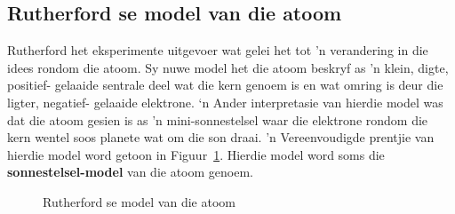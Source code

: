             \subsection*{Rutherford se model van die atoom}
            \nopagebreak
\begin{minipage}{.5\textwidth}
            \label{m38756*id254751}
Rutherford het eksperimente uitgevoer wat gelei het tot 'n verandering in die idees rondom die atoom. Sy nuwe model het die atoom beskryf as 'n klein, digte, positief- gelaaide sentrale deel wat die kern genoem is en wat omring is deur die ligter, negatief- gelaaide elektrone. ‘n
Ander interpretasie van hierdie model was dat die atoom gesien is as 'n mini-sonnestelsel waar die elektrone rondom die kern wentel
soos planete wat om die son draai. 'n Vereenvoudigde prentjie van hierdie model word getoon in Figuur~\ref{fig:atom:rutherfordmodel}. Hierdie model word soms die \textbf{sonnestelsel-model} van die atoom genoem. \par 
\end{minipage}
\begin{minipage}{.5\textwidth}
    \setcounter{subfigure}{0}
	\begin{figure}[H] %
    \begin{center}
\caption{Rutherford se model van die atoom}
\end{center}
\label{fig:atom:rutherfordmodel}
 \end{figure} 
\end{minipage}      
      \label{m38756*uid6}

